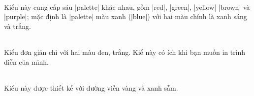 \begin{description}
\item{}\\
Kiểu này cung cấp sáu |palette| khác nhau, gồm |red|, |green|, |yellow|
|brown| và |purple|; mặc định là |palette| màu xanh (|blue|) với hai màu chính
là xanh sáng và trắng.
\\
\item{}\\
Kiểu đơn giản chỉ với hai màu đen, trắng.
Kiể này có ích khi bạn muốn in trình diễn của mình.
\\
\item{}\\
Kiểu này được thiết kế với đường viền vàng và xanh sẫm.

\end{description}

